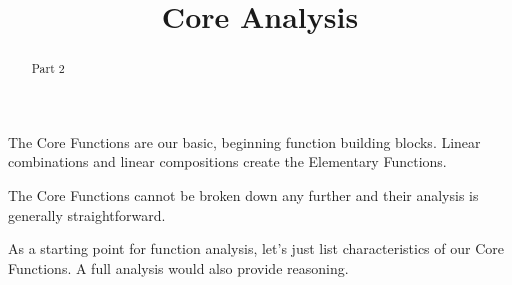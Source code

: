 \documentclass{ximera}
\title{Core Analysis}
\begin{document}
\begin{abstract}
Part 2
\end{abstract}
\maketitle




The Core Functions are our basic, beginning function building blocks. Linear combinations and linear compositions create the Elementary Functions.

The Core Functions cannot be broken down any further and their analysis is generally straightforward.

As a starting point for function analysis, let's just list characteristics of our Core Functions. A full analysis would also provide reasoning.
\end{document}
